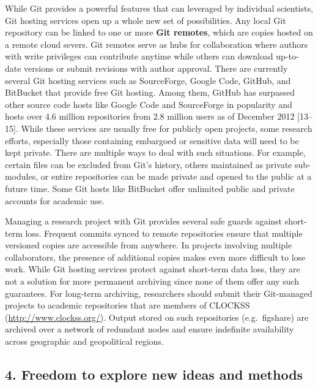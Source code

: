 \documentclass[]{article}
\begin{document}
While Git provides a powerful features that can leveraged by individual
scientists, Git hosting services open up a whole new set of
possibilities. Any local Git repository can be linked to one or more
\textbf{Git remotes}, which are copies hosted on a remote cloud severs.
Git remotes serve as hubs for collaboration where authors with write
privileges can contribute anytime while others can download up-to-date
versions or submit revisions with author approval. There are currently
several Git hosting services such as SourceForge, Google Code, GitHub,
and BitBucket that provide free Git hosting. Among them, GitHub has
surpassed other source code hosts like Google Code and SourceForge in
popularity and hosts over 4.6 million repositories from 2.8 million
users as of December 2012 {[}13--15{]}. While these services are usually
free for publicly open projects, some research efforts, especially those
containing embargoed or sensitive data will need to be kept private.
There are multiple ways to deal with such situations. For example,
certain files can be excluded from Git's history, others maintained as
private sub-modules, or entire repositories can be made private and
opened to the public at a future time. Some Git hosts like BitBucket
offer unlimited public and private accounts for academic use.

Managing a research project with Git provides several safe guards
against short-term loss. Frequent commits synced to remote repositories
ensure that multiple versioned copies are accessible from anywhere. In
projects involving multiple collaborators, the presence of additional
copies makes even more difficult to lose work. While Git hosting
services protect against short-term data loss, they are not a solution
for more permanent archiving since none of them offer any such
guarantees. For long-term archiving, researchers should submit their
Git-managed projects to academic repositories that are members of
CLOCKSS (\url{http://www.clockss.org/}). Output stored on such
repositories (e.g.~figshare) are archived over a network of redundant
nodes and ensure indefinite availability across geographic and
geopolitical regions.

\subsection{4. Freedom to explore new ideas and methods}
\end{document}
